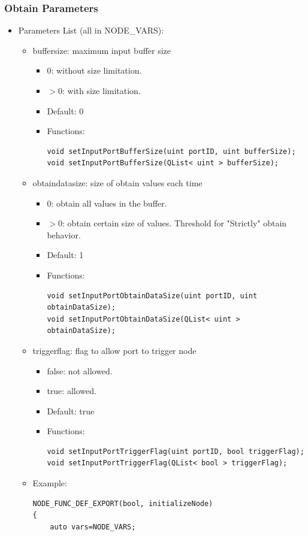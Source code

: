 \documentclass[a4paper,10pt]{book}
\begin{document}
\subsubsection{Obtain Parameters}

\begin{mdframed}
\begin{itemize}
 \item Parameters List (all in NODE\_VARS):
 \begin{itemize}
  \item buffersize: maximum input buffer size
  \begin{itemize}
   \item 0: without size limitation.
   \item $>$0: with size limitation.
   \item Default: 0
   \item Functions:
   \begin{verbatim}
void setInputPortBufferSize(uint portID, uint bufferSize);
void setInputPortBufferSize(QList< uint > bufferSize);
   \end{verbatim}
  \end{itemize}
  \item obtaindatasize: size of obtain values each time
  \begin{itemize}
   \item 0: obtain all values in the buffer.
   \item $>$0: obtain certain size of values. Threshold for "Strictly" obtain behavior.
   \item Default: 1
   \item Functions:
   \begin{verbatim}
void setInputPortObtainDataSize(uint portID, uint obtainDataSize);
void setInputPortObtainDataSize(QList< uint > obtainDataSize);
   \end{verbatim}
  \end{itemize}
  \item triggerflag: flag to allow port to trigger node
  \begin{itemize}
   \item false: not allowed.
   \item true: allowed.
   \item Default: true
   \item Functions:
      \begin{verbatim}
void setInputPortTriggerFlag(uint portID, bool triggerFlag);
void setInputPortTriggerFlag(QList< bool > triggerFlag);
   \end{verbatim}
  \end{itemize}
  \item Example:
  \begin{verbatim}
NODE_FUNC_DEF_EXPORT(bool, initializeNode)
{
    auto vars=NODE_VARS;
    

\end{verbatim}
\end{itemize}
\end{itemize}
\end{mdframed}
\end{document}
